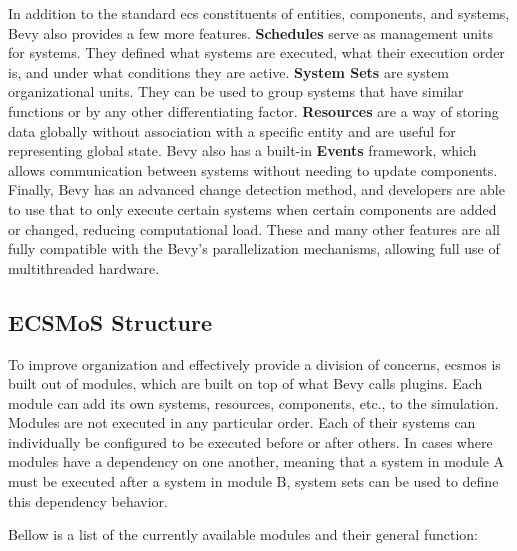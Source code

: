 \documentclass[twoside, 11pt]{article}
\begin{document}
In addition to the standard \gls{ecs} constituents of entities, components, and systems, Bevy also provides a few more features. \textbf{Schedules} serve as management units for systems. They defined what systems are executed, what their execution order is, and under what conditions they are active. \textbf{System Sets} are system organizational units. They can be used to group systems that have similar functions or by any other differentiating factor. \textbf{Resources} are a way of storing data globally without association with a specific entity and are useful for representing global state. Bevy also has a built-in \textbf{Events} framework, which allows communication between systems without needing to update components. Finally, Bevy has an advanced change detection method, and developers are able to use that to only execute certain systems when certain components are added or changed, reducing computational load. These and many other features are all fully compatible with the Bevy's parallelization mechanisms, allowing full use of multithreaded hardware.

\subsection{ECSMoS Structure}

To improve organization and effectively provide a division of concerns, \gls{ecsmos} is built out of modules, which are built on top of what Bevy calls plugins. Each module can add its own systems, resources, components, etc., to the simulation. Modules are not executed in any particular order. Each of their systems can individually be configured to be executed before or after others. In cases where modules have a dependency on one another, meaning that a system in module A must be executed after a system in module B, system sets can be used to define this dependency behavior.

Bellow is a list of the currently available modules and their general function:
\end{document}
